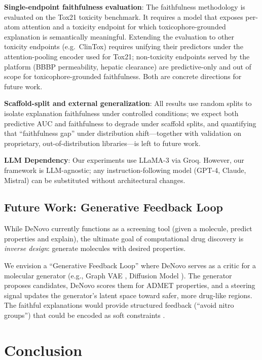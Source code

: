 \documentclass[conference]{IEEEtran}
\begin{document}
\textbf{Single-endpoint faithfulness evaluation}: The faithfulness methodology is evaluated on the Tox21 toxicity benchmark. It requires a model that exposes per-atom attention and a toxicity endpoint for which toxicophore-grounded explanation is semantically meaningful. Extending the evaluation to other toxicity endpoints (e.g.\ ClinTox) requires unifying their predictors under the attention-pooling encoder used for Tox21; non-toxicity endpoints served by the platform (BBBP permeability, hepatic clearance) are predictive-only and out of scope for toxicophore-grounded faithfulness. Both are concrete directions for future work.

\textbf{Scaffold-split and external generalization}: All results use random splits to isolate explanation faithfulness under controlled conditions; we expect both predictive AUC and faithfulness to degrade under scaffold splits, and quantifying that ``faithfulness gap'' under distribution shift---together with validation on proprietary, out-of-distribution libraries---is left to future work.

\textbf{LLM Dependency}: Our experiments use LLaMA-3 via Groq. However, our framework is LLM-agnostic; any instruction-following model (GPT-4, Claude, Mistral) can be substituted without architectural changes.


\subsection{Future Work: Generative Feedback Loop}

While DeNovo currently functions as a screening tool (given a molecule, predict properties and explain), the ultimate goal of computational drug discovery is \textit{inverse design}: generate molecules with desired properties.

We envision a ``Generative Feedback Loop'' where DeNovo serves as a critic for a molecular generator (e.g., Graph VAE \cite{jin2018junction}, Diffusion Model \cite{jo2022score}). The generator proposes candidates, DeNovo scores them for ADMET properties, and a steering signal updates the generator's latent space toward safer, more drug-like regions. The faithful explanations would provide structured feedback (``avoid nitro groups'') that could be encoded as soft constraints \cite{kotsias2020direct}.



\section{Conclusion}
\end{document}
